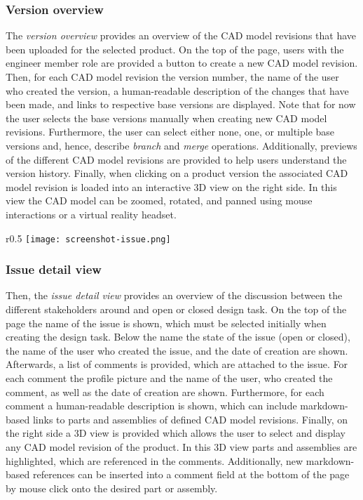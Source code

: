 \subsubsection{Version overview}

The \textit{version overview} provides an overview of the CAD model revisions that have been uploaded for the selected product.
On the top of the page, users with the engineer member role are provided a button to create a new CAD model revision.
Then, for each CAD model revision the version number, the name of the user who created the version, a human-readable description of the changes that have been made, and links to respective base versions are displayed.
Note that for now the user selects the base versions manually when creating new CAD model revisions.
Furthermore, the user can select either none, one, or multiple base versions and, hence, describe \textit{branch} and \textit{merge} operations.
Additionally, previews of the different CAD model revisions are provided to help users understand the version history.
Finally, when clicking on a product version the associated CAD model revision is loaded into an interactive 3D view on the right side.
In this view the CAD model can be zoomed, rotated, and panned using mouse interactions or a virtual reality headset.

\begin{wrapfigure}{r}{0.5\textwidth}
    \centering
    \texttt{[image: screenshot-issue.png]}
    \label{fig:screenshot-issue}
\end{wrapfigure}

\subsubsection{Issue detail view}

Then, the \textit{issue detail view} provides an overview of the discussion between the different stakeholders around and open or closed design task.
On the top of the page the name of the issue is shown, which must be selected initially when creating the design task.
Below the name the state of the issue (open or closed), the name of the user who created the issue, and the date of creation are shown.
Afterwards, a list of comments is provided, which are attached to the issue.
For each comment the profile picture and the name of the user, who created the comment, as well as the date of creation are shown.
Furthermore, for each comment a human-readable description is shown, which can include markdown-based links to parts and assemblies of defined CAD model revisions.
Finally, on the right side a 3D view is provided which allows the user to select and display any CAD model revision of the product.
In this 3D view parts and assemblies are highlighted, which are referenced in the comments.
Additionally, new markdown-based references can be inserted into a comment field at the bottom of the page by mouse click onto the desired part or assembly.

